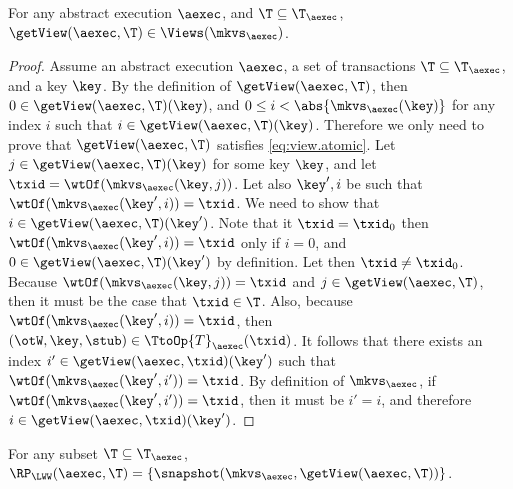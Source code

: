 \begin{proposition}
\label{prop:getview.valid}
For any abstract execution $\aexec$, and $\T \subseteq \T_{\aexec}$, 
$\getView(\aexec, \T) \in \Views(\mkvs_{\aexec})$.
\end{proposition}
\begin{proof}
Assume an abstract execution $\aexec$, a set of transactions $\T \subseteq \T_{\aexec}$, and a key \( \key \).
By the definition of $\getView(\aexec, \T)$, 
then $0 \in \getView(\aexec, \T)(\key)$, and 
$0 \leq i < \abs{ \mkvs_{\aexec}(\key) }$ for any index \( i \) such that $i \in \getView(\aexec, \T)(\key)$.
Therefore we only need to prove that $\getView(\aexec, \T)$ satisfies \eqref{eq:view.atomic}.
Let $j \in \getView(\aexec, \T)(\key)$ for some key $\key$, and let $\txid = 
\wtOf(\mkvs_{\aexec}(\key, j))$. Let also $\key', i$ be such that 
$\wtOf(\mkvs_{\aexec}(\key', i)) = \txid$. We need to show that 
$i \in \getView(\aexec, \T)(\key')$. Note that it $\txid = \txid_{0}$ 
then $\wtOf(\mkvs_{\aexec}(\key', i)) = \txid$ only if $i = 0$, and 
$0 \in \getView(\aexec, \T)(\key')$ by definition. 
Let then $\txid \neq \txid_{0}$. Because $\wtOf(\mkvs_{\aexec}(\key, j)) = \txid$ 
and $j \in \getView(\aexec, \T)$, then it must be the case that $\txid \in \T$. 
Also, because $\wtOf(\mkvs_{\aexec}(\key', i)) = \txid$, then $(\otW, \key, \stub) \in 
\TtoOp{T}_{\aexec}(\txid)$. It follows that there exists an index $i' \in \getView(\aexec, \txid)(\key')$ 
such that $\wtOf(\mkvs_{\aexec}(\key', i')) = \txid$. By definition of 
$\mkvs_{\aexec}$, if $\wtOf(\mkvs_{\aexec}(\key', i')) = \txid$, then it must 
be $i' = i$, and therefore $i \in \getView(\aexec, \txid)(\key')$.
\end{proof}


\begin{proposition}
\label{prop:compatible.aexec2kv}
For any subset $\T \subseteq \T_{\aexec}$, $\RP_{\LWW}(\aexec, \T) = \{\snapshot(\mkvs_{\aexec}, \getView(\aexec, \T))\}$.
\end{proposition}

